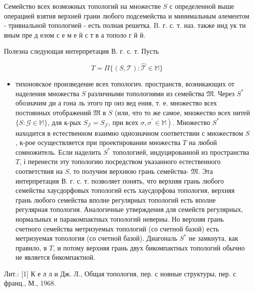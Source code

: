 \documentclass[10pt]{article}
\begin{document}
Семейство всех возможных топологий на множестве $S$ с определенной выше операцией взятия верхней грани любого подсемейства и минимальным әлементом - тривиальной топологией - есть полная решетка. B. г. с. т. наз. также инд ук ти вным пре д елом с е м е й с т в а тополо г й й.



Полезна следующая интерпретация В. г. с. т. Пусть



\[

T=\Pi\{(S, \mathscr{\mathscr { T }}): \mathscr{\overparen { T }} \in \mathbb{M}\}

\]



\begin{itemize}

  \item тихоновское произведение всех топологич. пространств, возникающих от наделения множества $S$ различными топологиями из семейства $\mathfrak{M}$. Через $S^{*}$ обозначим ди а гона ль этого пр оиз вед ения, т. е. множество всех постоянных отображений $\mathfrak{M}$ в $S$ (или, что то же самое, множество всех нитей $\{S: \mathscr{G} \in \mathbb{M}\}$, для к-рых $S_{\mathscr{J}}=S_{\mathscr{J}}$, при всех $\left.\mathscr{\sigma}, \mathscr{\sigma}^{\prime} \in \mathbb{M}\right)$. Множество $S^{*}$ находится в естественном взаимно однозначном соответствии с множеством $S$, к-рое осуществляется при проектировании множества $T$ на любой сомножитель. Если наделить $S^{*}$ топологией, индуцированной из пространства $T$, і перенести эту топологию посредством указанного естественного соответствия на $S$, то получим верхнюю грань семейства- $\mathfrak{M}$. Эта интерпретация В. г. с. т. позволяет понять, что верхняя грань любого семейства хаусдорфовых топологий есть хаусдорфова топология, верхняя грань любого семейства вполне регулярных топологий есть вполне регулярная топология. Аналогичные утверждения для семейств регулярных, нормальных и паракомпактных топологий неверны. Но верхняя грань счетного семейства метризуемых топологий (со счетной базой) есть метризуемая топология (со счетной базой). Диагональ $S^{*}$ не замкнута, как правило, в $T$, и потому верхняя грань двух бикомпактных топологий обычно не является бикомпактной.

\end{itemize}



Лит.: [1] К е л л и Дж. Л., Общая топология, пер. с новные структуры, пер. с франц., М., 1968.
\end{document}
